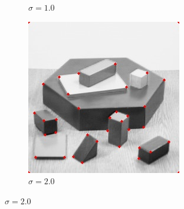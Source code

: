 \documentclass[10pt,a4paper,twoside]{article}
\begin{document}
\begin{figure}[h]
\begin{subfigure}{0.25\textwidth}
    \caption{$\sigma=1.0$}
    \end{subfigure}
    \begin{subfigure}{0.25\textwidth}
    \includegraphics[width=0.9\linewidth, height=0.9\linewidth]{sweep_blocks/blocks_20_005_1e-05.jpg} 
    \caption{$\sigma=2.0$}
    \end{subfigure}
    

\end{figure}
\end{document}
